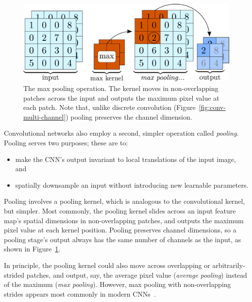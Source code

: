 \documentclass[11pt, a4paper]{article}
\DeclarePairedDelimiter\floor{\lfloor}{\rfloor}  %
\begin{document}
\begin{figure}[htb!]
    \centering
    \includegraphics[width=0.8\linewidth]{vector/pooling.pdf}
    \vspace{-2mm}
    \caption{The max pooling operation.
    The kernel moves in non-overlapping patches across the input and outputs the maximum pixel value at each patch.
    Note that, unlike discrete convolution (Figure~\ref{fig:conv-multi-channel}) pooling preserves the channel dimension.}
    \label{fig:pooling}
\end{figure}
Convolutional networks also employ a second, simpler operation called \textit{pooling}.
Pooling serves two purposes; these are to:
\begin{itemize}

    \item make the CNN's output invariant to local translations of the input image, and

    \item spatially downsample an input without introducing new learnable parameters.

\end{itemize}
Pooling involves a pooling kernel, which is analogous to the convolutional kernel, but simpler.
Most commonly, the pooling kernel slides across an input feature map's spatial dimensions in non-overlapping patches, and outputs the maximum pixel value at each kernel position.
Pooling preserves channel dimensions, so a pooling stage's output always has the same number of channels as the input, as shown in Figure~\ref{fig:pooling}.

In principle, the pooling kernel could also move across overlapping or arbitrarily-strided patches, and output, say, the average pixel value (\textit{average pooling}) instead of the maximum (\textit{max pooling}).
However, max pooling with non-overlapping strides appears most commonly in modern CNNs~\cite{homl}.


\end{document}
